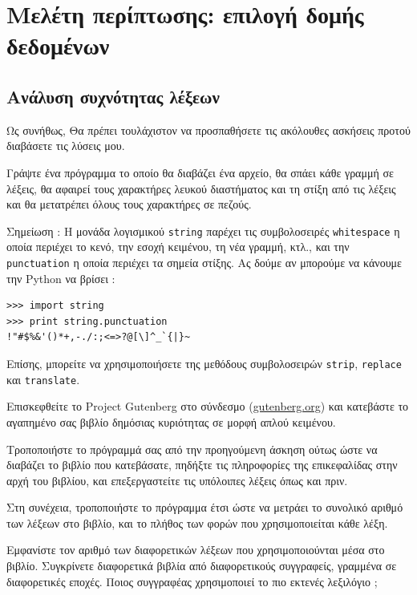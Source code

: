 \documentclass[10pt]{book}
\begin{document}

 


\chapter{Μελέτη περίπτωσης: επιλογή δομής δεδομένων}

\section{Ανάλυση συχνότητας λέξεων}
\label{analysis}

Ως συνήθως, Θα πρέπει τουλάχιστον να προσπαθήσετε τις ακόλουθες ασκήσεις προτού διαβάσετε τις λύσεις μου.

\begin{exercise}

Γράψτε ένα πρόγραμμα το οποίο θα διαβάζει ένα αρχείο, θα σπάει κάθε γραμμή σε λέξεις, θα αφαιρεί τους χαρακτήρες λευκού διαστήματος και τη στίξη από τις λέξεις και θα μετατρέπει όλους τους χαρακτήρες σε πεζούς.

Σημείωση :  Η μονάδα λογισμικού  {\tt string}  παρέχει τις συμβολοσειρές  {\tt whitespace}  η οποία περιέχει το κενό, την εσοχή κειμένου, τη νέα γραμμή, κτλ., και την  {\tt punctuation}  η οποία περιέχει τα σημεία στίξης. Ας δούμε αν μπορούμε να κάνουμε την  Python  να βρίσει :

\begin{verbatim}
>>> import string
>>> print string.punctuation
!"#$%&'()*+,-./:;<=>?@[\]^_`{|}~
\end{verbatim}
%
 Επίσης, μπορείτε να χρησιμοποιήσετε της μεθόδους συμβολοσειρών  {\tt strip},
{\tt replace}  και  {\tt translate}.
\end{exercise}

 
\begin{exercise}

Επισκεφθείτε το  Project Gutenberg  στο σύνδεσμο  (\url{gutenberg.org})  και κατεβάστε το αγαπημένο σας βιβλίο δημόσιας κυριότητας σε μορφή απλού κειμένου.

Τροποποιήστε το πρόγραμμά σας από την προηγούμενη άσκηση ούτως ώστε να διαβάζει το βιβλίο που κατεβάσατε, πηδήξτε τις πληροφορίες της επικεφαλίδας στην αρχή του βιβλίου, και επεξεργαστείτε τις υπόλοιπες λέξεις όπως και πριν.

Στη συνέχεια, τροποποιήστε το πρόγραμμα έτσι ώστε να μετράει το συνολικό αριθμό των λέξεων στο βιβλίο, και το πλήθος των φορών που χρησιμοποιείται κάθε λέξη.

Εμφανίστε τον αριθμό των διαφορετικών λέξεων που χρησιμοποιούνται μέσα στο βιβλίο. Συγκρίνετε διαφορετικά βιβλία από διαφορετικούς συγγραφείς, γραμμένα σε διαφορετικές εποχές. Ποιος συγγραφέας χρησιμοποιεί το πιο εκτενές λεξιλόγιο ;
\end{exercise}
\end{document}

